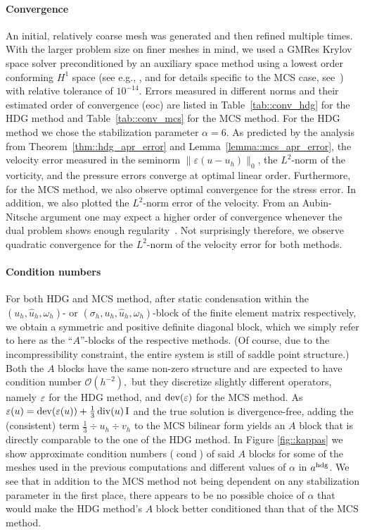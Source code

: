 \bigskip\paragraph{\textbf{Convergence}} An initial, relatively coarse
mesh was generated and then refined multiple times.
With the larger problem size on finer meshes in mind, we used a GMRes Krylov space solver 
preconditioned by an auxiliary space method using a lowest order conforming $H^1$ space
(see e.g., \cite{Fu2021}, and for details specific to the MCS case, see~\cite{stokesAux})
with relative tolerance of $10^{-14}$.
Errors measured in different norms and their estimated
order of convergence (eoc) are listed in Table~\ref{tab::conv_hdg}
for the HDG method and Table~\ref{tab::conv_mcs} for the MCS method. For the
HDG method we chose the stabilization parameter $\alpha=6$. As
predicted by the analysis from Theorem~\ref{thm::hdg_apr_error} and
Lemma~\ref{lemma::mcs_apr_error}, the velocity error measured in the
seminorm $\| \varepsilon(u - u_h)\|_0$,  the $L^2$-norm of the
vorticity, and the pressure errors converge at optimal linear order.
Furthermore, for the MCS method, we also observe optimal convergence
for  the stress error. In addition,  we also plotted the $L^2$-norm error
of the velocity. From an Aubin-Nitsche argument one may 
expect a higher order of convergence whenever the dual problem shows
enough regularity~\cite{brezzi2012mixed, mcsI}. Not surprisingly therefore,
 we observe
 quadratic convergence for the $L^2$-norm of the velocity error  for
both methods.




\bigskip\paragraph{\textbf{Condition numbers}} For both HDG and MCS
method, after static condensation within the $(u_h,\hat{u}_h,
\omega_h)$- or $(\sigma_h, u_h, \hat{u}_h, \omega_h)$-block of the
finite element matrix respectively, we obtain a symmetric and positive
definite diagonal block, which we  simply refer to here
as the ``$A$''-blocks of the respective methods.
(Of course, due to the incompressibility constraint, the entire system is
still of saddle point structure.) Both the $A$ blocks have the same
non-zero structure and are expected to have condition number
$\mathcal{O}(h^{-2}),$ but they discretize slightly different operators, namely $\varepsilon$
for the HDG method, and $\operatorname{dev}(\varepsilon)$ for the MCS method. As $\varepsilon(u) =
\operatorname{dev}(\varepsilon(u)) + \frac{1}{3}\operatorname{div} (u) \operatorname{I}$ and the true solution is
divergence-free, adding the (consistent) term
$\frac{1}{3}\div u_h \div v_h $ to the MCS bilinear form yields an $A$
block that is directly comparable to the one of the HDG method. In
Figure \ref{fig::kappas} we show approximate condition numbers
($\operatorname{cond}$) of said $A$ blocks for some of the meshes used
in the previous computations and different values of $\alpha$ in
$a^{\operatorname{hdg}}$. We see that in addition to the MCS method not being
dependent on any stabilization parameter in the first place, there
appears to be no possible choice of $\alpha$ that would make the HDG method's $A$ block  better conditioned than that of the MCS method.


